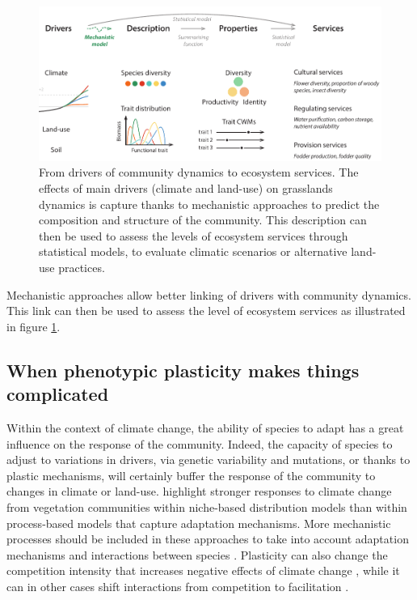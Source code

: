  
 
\begin{figure}
    \includegraphics[width=1\linewidth]{./1_Introduction/graphics/drivers_to_services.pdf}
  \caption[From drivers to ecosystem services]{From drivers of community dynamics to ecosystem services. The effects of main drivers (climate and land-use) on grasslands dynamics is capture thanks to mechanistic approaches to predict the composition and structure of the community. This description can then be used to assess the levels of ecosystem services through statistical models, to evaluate climatic scenarios or alternative land-use practices.}
  \label{fig:drivers2services}
\end{figure}

Mechanistic approaches allow better linking of drivers with community dynamics. This link can then be used to assess the level of ecosystem services as illustrated in figure \ref{fig:drivers2services}.




\subsection{When phenotypic plasticity makes things complicated}

Within the context of climate change, the ability of species to adapt has a great influence on the response of the community. Indeed, the capacity of species to adjust to variations in drivers, via genetic variability and mutations, or thanks to plastic mechanisms, will certainly buffer the response of the community to changes in climate or land-use. \cite{morin_comparing_2009} highlight stronger responses to climate change from vegetation communities within niche-based distribution models than within process-based models that capture adaptation mechanisms. More mechanistic processes should be included in these approaches \parencite{evans_toward_2016} to take into account adaptation mechanisms and interactions between species \parencite{gilman_framework_2010}. Plasticity can also change the competition intensity that increases negative effects of climate change  \parencite{hanel_phenotypic_2015}, while it can in other cases shift interactions from competition to facilitation  \cite{callaway_phenotypic_2003}.


